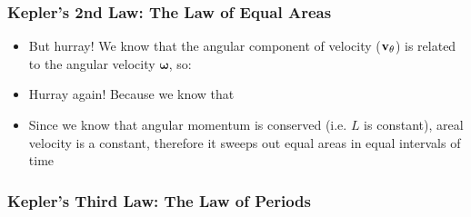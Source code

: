 \documentclass[12pt,compress,aspectratio=169]{beamer}
\newcommand{\mb}[1]{\ensuremath\mathbf{#1}}
\begin{document}
\begin{frame}
  \frametitle{Kepler's 2nd Law: The Law of Equal Areas}

  \begin{itemize}
  \item But hurray! We know that the angular component of velocity
    ($\mb{v}_\theta$) is related to the angular velocity $\bm{\omega}$, so:
    
  \item Hurray again! Because we know that
    
    \vspace{-.4in}{\Large
      \begin{displaymath}
        rv_\theta=\left|\mb{r}\times\mb{v}_\theta\right|=\left|\frac{\mb{L}}{\mu}\right|=\frac{L}{\mu}
        \quad\longrightarrow\quad
        \boxed{\frac{dA}{dt} =\frac{L}{2\mu}}
      \end{displaymath}
    }
  \item Since we know that angular momentum is conserved (i.e. $L$ is constant),
    areal velocity is a constant, therefore it sweeps out equal areas in equal
    intervals of time
  \end{itemize}
\end{frame}


\begin{frame}
  \frametitle{Kepler's Third Law: The Law of Periods}
  \begin{center}
  \end{center}
\end{frame}
\end{document}
